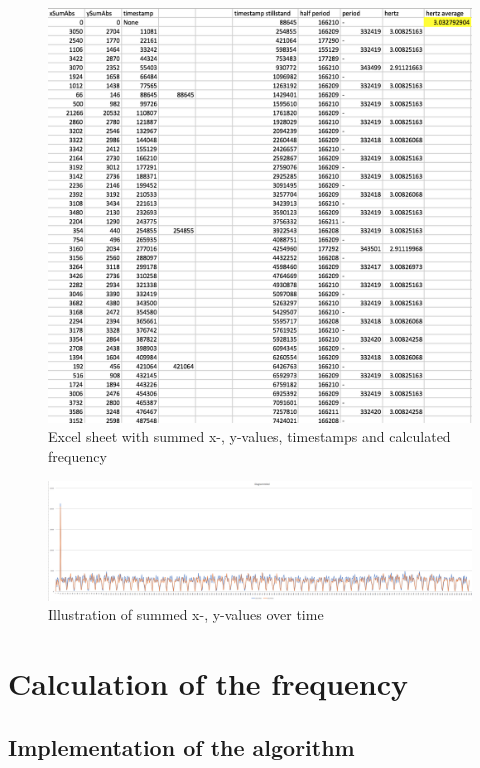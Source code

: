 \documentclass[12pt, a4paper]{report}
\begin{document}
\bigskip
\noindent
\begin{figure}
\centering
\includegraphics[scale=0.4]{Images/excel_sheet_numbers.png}

\caption{Excel sheet with summed x-, y-values, timestamps and calculated frequency}
\end{figure}

\bigskip

\bigskip
\noindent
\begin{figure}
\centering
\includegraphics[scale=0.3]{Images/excel_sheet_graph.png}

\caption{Illustration of summed x-, y-values over time}
\end{figure}
\bigskip
 
\chapter{Calculation of the frequency}

\section{Implementation of the algorithm}
\end{document}
